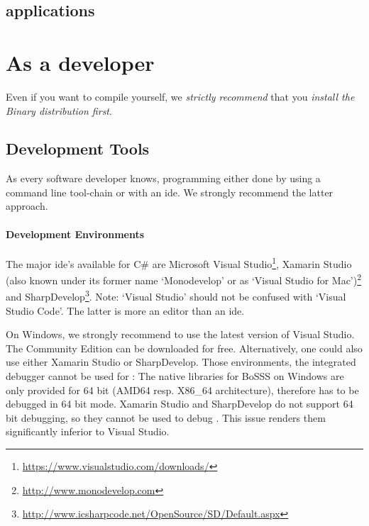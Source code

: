 \documentclass[a4paper,10pt]{report} %
\begin{document}
\subsection{\BoSSSpad{}}

\code{}

\subsection{\BoSSS{} applications}




\section{As a developer}
\label{sec:gettingStarted_developing}

Even if you want to compile \BoSSS{} yourself, we \emph{strictly recommend} that
you \emph{install the Binary distribution first}.


\subsection{Development Tools}
As every software developer knows, programming either done by using a 
command line tool-chain or with an \ac{ide}. We strongly recommend the latter 
approach.

\paragraph{Development Environments}
The major \ac{ide}'s available for C\# are 
Microsoft Visual Studio\footnote{
\url{https://www.visualstudio.com/downloads/}},
Xamarin Studio (also known under its former name `Monodevelop' or as `Visual Studio for Mac')\footnote{
\url{http://www.monodevelop.com}}
and SharpDevelop\footnote{
\url{http://www.icsharpcode.net/OpenSource/SD/Default.aspx}}.
Note: `Visual Studio' should not be confused with `Visual Studio Code'. The latter is more an editor
than an \ac{ide}.

On Windows, we strongly recommend to use the latest version of Visual Studio.
The Community Edition can be downloaded for free.
Alternatively, one could also use either Xamarin Studio or SharpDevelop.
Those environments, the integrated debugger cannot be used for \BoSSS{}:
The native libraries for BoSSS on Windows are only provided for  
64 bit (AMD64 resp. X86\_64 architecture), therefore \BoSSS{} has to be debugged in 64 bit mode.
Xamarin Studio and SharpDevelop do not support 64 bit debugging, so they cannot be used to
debug \BoSSS{}.
This issue renders them significantly inferior to Visual Studio.
\end{document}
